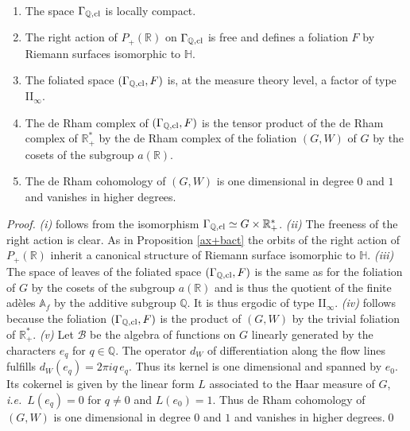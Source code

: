 \documentclass[graybox, envcountsect%
]{svmult}
\def\A{{\mathbb A}}
\def\Q{{\mathbb Q}}
\def\R{{\mathbb R}}
\def\H{{\mathbb H}}
\def\cB{{\mathcal B}}
\newcommand{\ie}{{\it i.e.\/}\ }
\begin{document}
\begin{proposition}\label{classorb1}\
\begin{enumerate}
\item[(i)] The space $\Gamma_{\Q,{\rm cl}}$ is locally compact. 
\item[(ii)] The  right action of  $P_+(\R)$ on $\Gamma_{\Q,{\rm cl}}$ is free and defines a foliation $F$ by Riemann surfaces  isomorphic to $\H$. 
\item[(iii)] The foliated space $(\Gamma_{\Q,{\rm cl}},F)$ is, at the measure theory level, a factor of type II$_\infty$.
\item[(iv)] The de Rham complex of $(\Gamma_{\Q,{\rm cl}},F)$ is the tensor product of the de Rham complex of $\R_+^*$ by the de Rham complex of the foliation $(G,W)$ of $G$ by 
	the cosets of the subgroup $a(\R)$.
\item[(v)] The de Rham cohomology of $(G,W)$ is one dimensional in degree $0$ and $1$ and vanishes in higher degrees.
\end{enumerate} 
\end{proposition}
\begin{proof} {\it (i)} follows from the isomorphism $\Gamma_{\Q,{\rm cl}}\simeq G\times \R_+^*$. \newline
	{\it (ii)} The freeness of the right action is clear. As in Proposition \ref{ax+bact} the orbits of the right action of  $P_+(\R)$ inherit a canonical structure of Riemann surface isomorphic to $\H$. 	\newline
	{\it (iii)} The space of leaves of the foliated space $(\Gamma_{\Q,{\rm cl}},F)$ is the same as for  the foliation of $G$ by the cosets of the subgroup $a(\R)$ and is thus the quotient of   the finite ad\`eles $\A_f$ by the additive subgroup $\Q$. It is thus ergodic of type II$_\infty$.\newline
	{\it (iv)} follows because the foliation $(\Gamma_{\Q,{\rm cl}},F)$ is the product of $(G,W)$ by the trivial foliation of $\R_+^*$. \newline
	{\it (v)} Let $\cB$ be the algebra of functions on $G$ linearly generated by the characters $e_q$ for $q\in \Q$. The operator  $d_W$ of differentiation along the flow lines fulfills $d_W(e_q)=2\pi i q\, e_q$. Thus its kernel is one dimensional and spanned by $e_0$. Its cokernel is given by the linear form $L$ associated to the Haar measure of $G$, \ie $L(e_q)=0$ for $q\neq 0$ and $L(e_0)=1$. Thus de Rham cohomology of $(G,W)$ is one dimensional in degree $0$ and $1$ and vanishes in higher degrees.\qed\end{proof}
\end{document}
